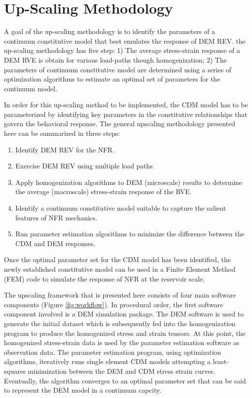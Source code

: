 \section{Up-Scaling Methodology}
A goal of the up-scaling methodology is to identify the parameters of a continuum constitutive model that best emulates the response of DEM REV. the up-scaling methodology has five step: 1) The average stress-strain response of a DEM RVE is obtain for various load-paths though homogenization; 2) The parameters of continuum constitutive model are determined using a series of optimization algorithms to estimate an optimal set of parameters for the continuum model.

In order for this  up-scaling method to be implemented, the CDM model has to be parameterized by identifying key parameters in the constitutive relationships that govern the behavioral response. The general upscaling methodology presented here can be summarized in three steps:
\begin{enumerate}
    \item Identify DEM REV for the NFR.
	\item Exercise DEM REV using multiple load paths.
	\item Apply homogenization algorithms to DEM (microscale) results to determine the average (macroscale) stress-strain response of the RVE.
	\item Identify a continuum constitutive model suitable to capture the salient features of NFR mechanics.
	\item Run parameter estimation algorithms to minimize the difference between the CDM and DEM responses.
\end{enumerate}

Once the optimal parameter set for the CDM model has been identified, the newly established constitutive model can be used in a Finite Element Method (FEM) code to simulate the response of NFR at the reservoir scale.

The upscaling framework that is presented here consists of four main software components (Figure \ref{fig:workflow}). In procedural order, the first software component involved is a DEM simulation package. The DEM software is used to generate the initial dataset which is subsequently fed into the homogenization program to produce the homogenized stress and strain tensors. At this point, the homogenized stress-strain data is used by the parameter estimation software as observation data. The parameter estimation program, using optimization algorithms, iteratively runs single element CDM models attempting a least-squares minimization between the DEM and CDM stress strain curves. Eventually, the algorithm converges to an optimal parameter set that can be said to represent the DEM model in a continuum capcity.

